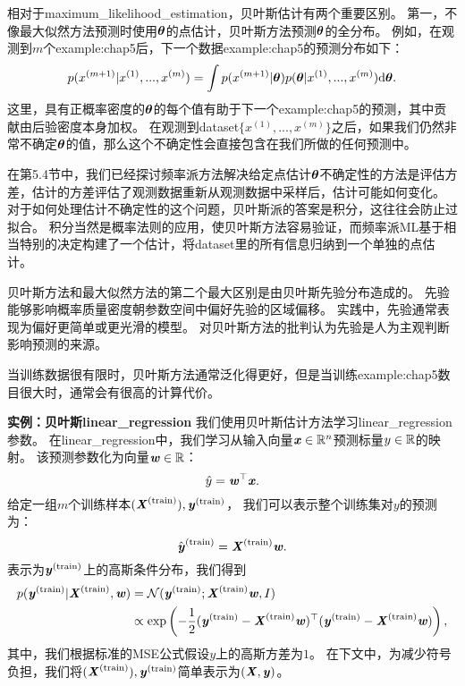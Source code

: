 相对于\gls{maximum_likelihood_estimation}，贝叶斯估计有两个重要区别。
第一，不像最大似然方法预测时使用$\boldsymbol{\theta}$的点估计，贝叶斯方法预测$\boldsymbol{\theta}$的全分布。
例如，在观测到$m$个\gls{example:chap5}后，下一个数据\gls{example:chap5}的预测分布如下：
\begin{equation}
    p(x^{(m+1)} | x^{(1)},...,x^{(m)}) = 
    \int p(x^{(m+1)} | \boldsymbol{\theta}) p(\boldsymbol{\theta} | x^{(1)},...,x^{(m)}) 
        \mathrm{d}\boldsymbol{\theta} .
\end{equation}
这里，具有正概率密度的$\boldsymbol{\theta}$的每个值有助于下一个\gls{example:chap5}的预测，其中贡献由后验密度本身加权。
在观测到\gls{dataset}$\{ x^{(1)},...,x^{(m)}\}$之后，如果我们仍然非常不确定$\boldsymbol{\theta}$的值，那么这个不确定性会直接包含在我们所做的任何预测中。


在第5.4节中，我们已经探讨频率派方法解决给定点估计$\boldsymbol{\theta}$不确定性的方法是评估方差，估计的方差评估了观测数据重新从观测数据中采样后，估计可能如何变化。
对于如何处理估计不确定性的这个问题，贝叶斯派的答案是积分，这往往会防止过拟合。
积分当然是概率法则的应用，使贝叶斯方法容易验证，而频率派\gls{ML}基于相当特别的决定构建了一个估计，将\gls{dataset}里的所有信息归纳到一个单独的点估计。

贝叶斯方法和最大似然方法的第二个最大区别是由贝叶斯先验分布造成的。
先验能够影响概率质量密度朝参数空间中偏好先验的区域偏移。
实践中，先验通常表现为偏好更简单或更光滑的模型。
对贝叶斯方法的批判认为先验是人为主观判断影响预测的来源。

当训练数据很有限时，贝叶斯方法通常泛化得更好，但是当训练\gls{example:chap5}数目很大时，通常会有很高的计算代价。

\textbf{实例：贝叶斯\gls{linear_regression}} \quad 我们使用贝叶斯估计方法学习\gls{linear_regression}参数。
在\gls{linear_regression}中，我们学习从输入向量$\boldsymbol{\mathit{x}}\in\mathbb{R}^n$预测标量$y\in\mathbb{R}$的映射。
该预测参数化为向量$\boldsymbol{\mathit{w}} \in \mathbb{R}$：
\begin{equation}
    \hat{y} = \boldsymbol{\mathit{w}}^\top \boldsymbol{\mathit{x}} .
\end{equation}
给定一组$m$个训练样本$(\boldsymbol{\mathit{X}}^{(\text{train})}), \boldsymbol{\mathit{y}}^{(\text{train})}$，
我们可以表示整个训练集对$y$的预测为：
\begin{equation}
    \hat{\boldsymbol{\mathit{y}}}^{(\text{train})} = \boldsymbol{\mathit{X}}^{(\text{train})} \boldsymbol{\mathit{w}} .
\end{equation}
表示为$\boldsymbol{\mathit{y}}^{(\text{train})}$上的高斯条件分布，我们得到
\begin{align}
    p(\boldsymbol{\mathit{y}}^{(\text{train})} | \boldsymbol{\mathit{X}}^{(\text{train})}, \boldsymbol{\mathit{w}}) &= 
    \mathcal{N}( \boldsymbol{\mathit{y}}^{(\text{train})}; \boldsymbol{\mathit{X}}^{(\text{train})}\boldsymbol{\mathit{w}}, I ) \\
    & \propto \exp\left( 
        -\frac{1}{2}( \boldsymbol{\mathit{y}}^{(\text{train})} - \boldsymbol{\mathit{X}}^{(\text{train})}\boldsymbol{\mathit{w}} )^\top
        ( \boldsymbol{\mathit{y}}^{(\text{train})} - \boldsymbol{\mathit{X}}^{(\text{train})}\boldsymbol{\mathit{w}} )
    \right),
\end{align}
其中，我们根据标准的MSE公式假设$y$上的高斯方差为$1$。
在下文中，为减少符号负担，我们将$(\boldsymbol{\mathit{X}}^{(\text{train})}), \boldsymbol{\mathit{y}}^{(\text{train})}$简单表示为$(\boldsymbol{\mathit{X}}, \boldsymbol{\mathit{y}})$。

